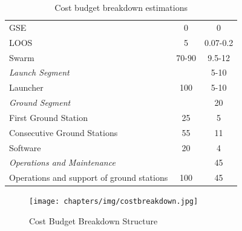 \begin{table}[htbp]
\begin{tabular}{p{10cm} | c | c }
       \hspace{2.5cm}GSE &         0 &          0\\

      \hspace{2.5cm}LOOS &         5 &         0.07-0.2 \\ \hline

     \hspace{2.0cm}Swarm &         70-90 &         9.5-12 \\ \hline

\textit{Launch Segment} &         &         5-10 \\ \hline

  \hspace{1.0cm}Launcher &         100 &        5-10  \\ \hline

\textit{Ground Segment} &          &     20     \\ \hline

\hspace{1.0cm}First Ground Station &         25 &      5    \\

\hspace{1.0cm}Consecutive Ground Stations &         55 &     11     \\

\hspace{1.0cm}Software &         20 &     4     \\ \hline

\textit{Operations and Maintenance} &          &        45  \\ \hline

\hspace{1.0cm}Operations and support of ground stations &         100 &   45       \\
	
\end{tabular} 
\caption{Cost budget breakdown estimations}
	\label{tab:CostBreakdown} 
\end{table}

\begin{figure}[ht!]
\begin{center}

\texttt{[image: chapters/img/costbreakdown.jpg]}
\caption{Cost Budget Breakdown Structure}
\label{fig:costbreak}
\end{center}
\end{figure}


